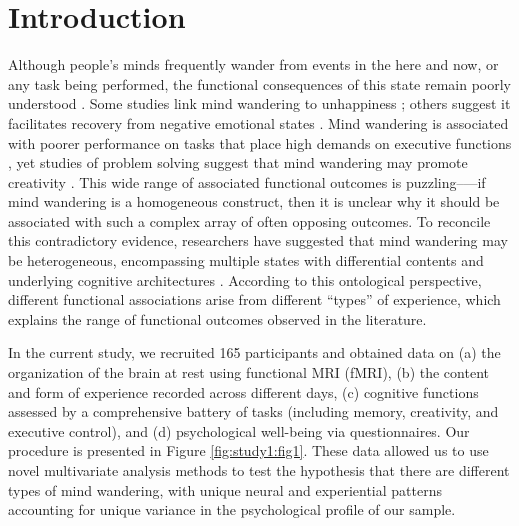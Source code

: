 \section{Introduction}
\label{study1:intro}

Although people's minds frequently wander from events in the here and now, or any task being performed, the functional consequences of this state remain poorly understood \cite{Mittner2016,Seli2016,SmallwoodHanna2013}.
Some studies link mind wandering to unhappiness
\cite{Killingsworth2010}; 
others suggest it facilitates recovery from negative emotional states
\cite{Poerio2016,Ruby2013a}.
Mind wandering is associated with poorer performance on tasks that place high demands on executive functions
\cite{McVay2009,Mrazek2012},
yet studies of problem solving suggest that mind wandering may promote creativity 
\cite{Baird2012,Smeekens2016}.
This wide range of associated functional outcomes is puzzling--—if mind wandering is a homogeneous construct, then it is unclear why it should be associated with such a complex array of often opposing outcomes. To reconcile this contradictory evidence, researchers have suggested that mind wandering may be heterogeneous, encompassing multiple states with differential contents and underlying cognitive architectures \cite{SmallwoodHanna2013}. According to this ontological perspective, different functional associations arise from different “types” of experience, which explains the range of functional outcomes observed in the literature.

In the current study, we recruited 165 participants and obtained data on (a) the organization of the brain at rest using functional MRI (fMRI), (b) the content and form of experience recorded across different days, (c) cognitive functions assessed by a comprehensive battery of tasks (including memory, creativity, and executive control), and (d) psychological well-being via questionnaires. Our procedure is presented in Figure \ref{fig:study1:fig1}. These data allowed us to use novel multivariate analysis methods to test the hypothesis that there are different types of mind wandering, with unique neural and experiential patterns accounting for unique variance in the psychological profile of our sample.

